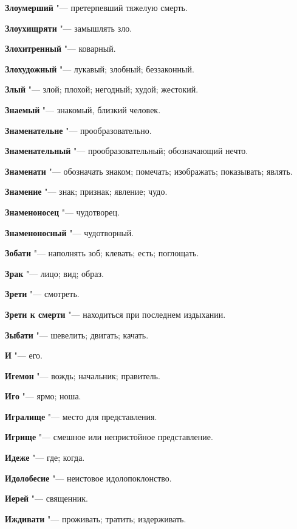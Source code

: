 \begin{mymulticols}
\noindent\textbf{Злоумерший} "--- претерпевший тяжелую смерть. 

\noindent\textbf{Злоухищряти} "--- замышлять зло. 

\noindent\textbf{Злохитренный} "--- коварный. 

\noindent\textbf{Злохудожный} "--- лукавый; злобный; беззаконный. 

\noindent\textbf{Злый} "--- злой; плохой; негодный; худой; жестокий. 

\noindent\textbf{Знаемый} "--- знакомый, близкий человек. 

\noindent\textbf{Знаменательне} "--- прообразовательно. 

\noindent\textbf{Знаменательный} "--- прообразовательный; обозначающий нечто. 

\noindent\textbf{Знаменати} "--- обозначать знаком; помечать; изображать; показывать; являть. 

\noindent\textbf{Знамение} "--- знак; признак; явление; чудо. 

\noindent\textbf{Знаменоносец} "--- чудотворец. 

\noindent\textbf{Знаменоносный} "--- чудотворный. 

\noindent\textbf{Зобати} "--- наполнять зоб; клевать; есть; поглощать. 

\noindent\textbf{Зрак} "--- лицо; вид; образ. 

\noindent\textbf{Зрети} "--- смотреть. 

\noindent\textbf{Зрети к смерти} "--- находиться при последнем издыхании. 

\noindent\textbf{Зыбати} "--- шевелить; двигать; качать. 

\bukvaending


\noindent\textbf{И} "--- его. 

\noindent\textbf{Игемон} "--- вождь; начальник; правитель. 

\noindent\textbf{Иго} "--- ярмо; ноша. 

\noindent\textbf{Игралище} "--- место для представления. 

\noindent\textbf{Игрище} "--- смешное или непристойное представление. 

\noindent\textbf{Идеже} "--- где; когда. 

\noindent\textbf{Идолобесие} "--- неистовое идолопоклонство. 

\noindent\textbf{Иерей} "--- священник. 

\noindent\textbf{Иждивати} "--- проживать; тратить; издерживать. 


\end{mymulticols}

